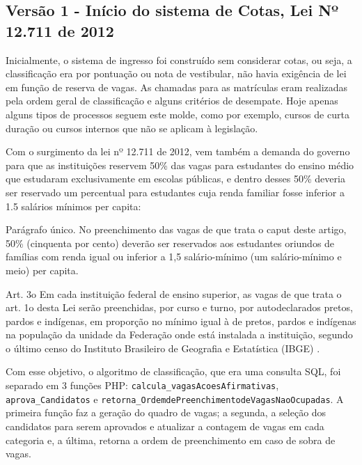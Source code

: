 \subsection{Versão 1 - Início do sistema de Cotas, Lei Nº 12.711 de 2012}
\label{versao1}

Inicialmente, o sistema de ingresso foi construído sem considerar cotas, ou seja, a classificação era por pontuação ou nota de vestibular, não havia exigência de lei em função de reserva de vagas. As chamadas para as matrículas eram realizadas pela ordem geral de classificação e alguns critérios de desempate. Hoje apenas alguns tipos de processos seguem este molde, como por exemplo, cursos de curta duração ou cursos internos que não se aplicam à legislação.

Com o surgimento da lei nº 12.711 de 2012, vem também a demanda do governo para que as instituições reservem 50\% das vagas para estudantes do ensino médio que estudaram exclusivamente em escolas públicas, e dentro desses 50\% deveria ser reservado um percentual para estudantes cuja renda familiar fosse inferior a 1.5 salários mínimos per capita:

\begin{citacao}
Parágrafo único.  No preenchimento das vagas de que trata o caput deste artigo, 50\% (cinquenta por cento) deverão ser reservados aos estudantes oriundos de famílias com renda igual ou inferior a 1,5 salário-mínimo (um salário-mínimo e meio) per capita.

Art. 3o  Em cada instituição federal de ensino superior, as vagas de que trata o art. 1o desta Lei serão preenchidas, por curso e turno, por autodeclarados pretos, pardos e indígenas, em proporção no mínimo igual à de pretos, pardos e indígenas na população da unidade da Federação onde está instalada a instituição, segundo o último censo do Instituto Brasileiro de Geografia e Estatística (IBGE) \cite{leicotas}.
\end{citacao}

Com esse objetivo, o algoritmo de classificação, que era uma consulta SQL, foi separado em 3 funções PHP: \texttt{calcula\_vagasAcoesAfirmativas}, \texttt{aprova\_Candidatos} e  \texttt{retorna\_OrdemdeP}\newline\texttt{reenchimentodeVagasNaoOcupadas}.  A primeira função faz a geração do quadro de vagas; a segunda, a seleção dos candidatos para serem aprovados e atualizar a contagem de vagas em cada categoria e, a última, retorna a ordem de preenchimento em caso de sobra de vagas.


